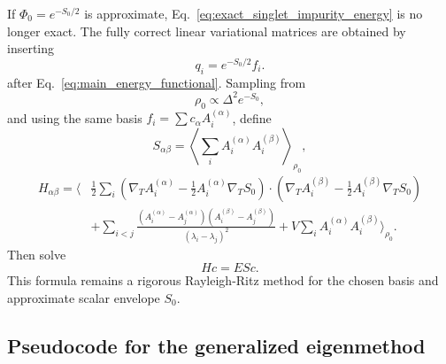 \documentclass[11pt]{article}
\newcommand{\gradT}{\nabla_{\!T}}
\begin{document}
If $\Phi_0=e^{-S_0/2}$ is approximate, Eq.~\eqref{eq:exact_singlet_impurity_energy} is no longer exact.  The fully correct linear variational matrices are obtained by inserting
\begin{equation}
q_i=e^{-S_0/2}f_i.
\end{equation}
after Eq.~\eqref{eq:main_energy_functional}.  Sampling from
\begin{equation}
\rho_0\propto\Delta^2e^{-S_0},
\end{equation}
and using the same basis $f_i=\sum c_\alpha A_i^{(\alpha)}$, define
\begin{equation}
S_{\alpha\beta}
=\left\langle\sum_iA_i^{(\alpha)}A_i^{(\beta)}\right\rangle_{\rho_0},
\end{equation}
\begin{align}
H_{\alpha\beta}
=\Bigg\langle&
\frac12\sum_i
\left(\gradT A_i^{(\alpha)}-\frac12A_i^{(\alpha)}\gradT S_0\right)
\cdot
\left(\gradT A_i^{(\beta)}-\frac12A_i^{(\beta)}\gradT S_0\right)
\nonumber\\
&+
\sum_{i<j}
\frac{(A_i^{(\alpha)}-A_j^{(\alpha)})(A_i^{(\beta)}-A_j^{(\beta)})}{(\lambda_i-\lambda_j)^2}
+V\sum_iA_i^{(\alpha)}A_i^{(\beta)}
\Bigg\rangle_{\rho_0}.
\label{eq:approx_singlet_H_matrix}
\end{align}
Then solve
\begin{equation}
\boxed{
Hc=ESc.
}
\label{eq:approx_singlet_generalized_eigen}
\end{equation}
This formula remains a rigorous Rayleigh-Ritz method for the chosen basis and approximate scalar envelope $S_0$.

\subsection{Pseudocode for the generalized eigenmethod}
\end{document}
